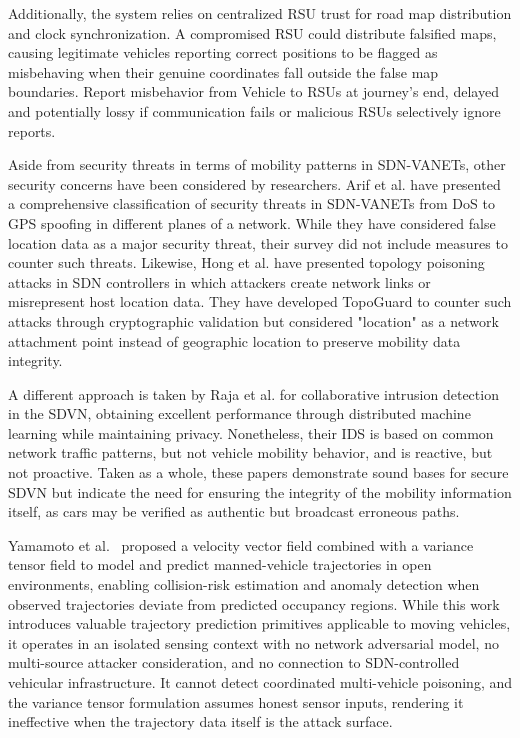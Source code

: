 \documentclass[12pt, a4paper]{report}
\begin{document}
Additionally, the system relies on centralized RSU trust for road map distribution and clock synchronization. A compromised RSU could distribute falsified maps, causing legitimate vehicles reporting correct positions to be flagged as misbehaving when their genuine coordinates fall outside the false map boundaries. Report misbehavior from Vehicle to RSUs at journey's end, delayed and potentially lossy if communication fails or malicious RSUs selectively ignore reports.

Aside from security threats in terms of mobility patterns in SDN-VANETs, other security concerns have been considered by researchers. Arif et al. \cite{arif2020} have presented a comprehensive classification of security threats in SDN-VANETs from DoS to GPS spoofing in different planes of a network. While they have considered false location data as a major security threat, their survey did not include measures to counter such threats. Likewise, Hong et al. \cite{hong2015} have presented topology poisoning attacks in SDN controllers in which attackers create network links or misrepresent host location data. They have developed TopoGuard to counter such attacks through cryptographic validation but considered "location" as a network attachment point instead of geographic location to preserve mobility data integrity.

A different approach is taken by Raja et al. \cite{raja2021} for collaborative intrusion detection in the SDVN, obtaining excellent performance through distributed machine learning while maintaining privacy. Nonetheless, their IDS is based on common network traffic patterns, but not vehicle mobility behavior, and is reactive, but not proactive. Taken as a whole, these papers demonstrate sound bases for secure SDVN but indicate the need for ensuring the integrity of the mobility information itself, as cars may be verified as authentic but broadcast erroneous paths.

Yamamoto et al.~\cite{yamamoto2020modeling} proposed a velocity vector field
combined with a variance tensor field to model and predict manned-vehicle
trajectories in open environments, enabling collision-risk estimation and
anomaly detection when observed trajectories deviate from predicted occupancy
regions. While this work introduces valuable trajectory prediction primitives
applicable to moving vehicles, it operates in an isolated sensing context with
no network adversarial model, no multi-source attacker consideration, and no
connection to SDN-controlled vehicular infrastructure. It cannot detect
coordinated multi-vehicle poisoning, and the variance tensor formulation
assumes honest sensor inputs, rendering it ineffective when the trajectory
data itself is the attack surface.
\end{document}
